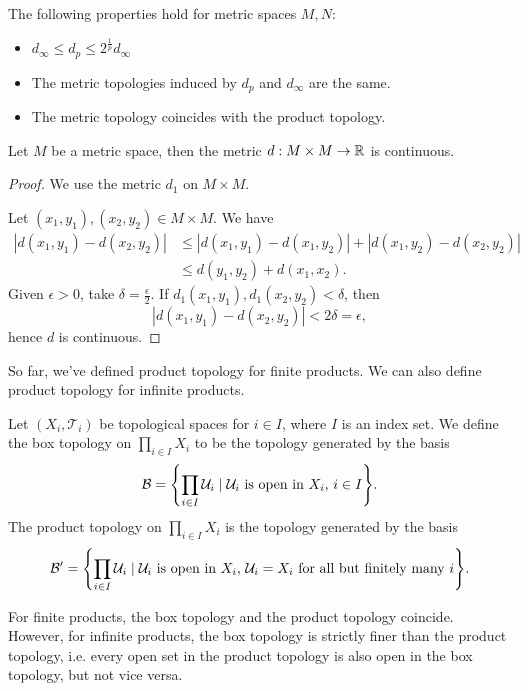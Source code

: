 \begin{prop}
    The following properties hold for metric spaces $M, N$:
    \begin{itemize}
        \item $d_\infty \leq d_p \leq 2^{\frac1p}d_\infty$
        \item The metric topologies induced by $d_p$ and $d_\infty$ are the same.
        \item The metric topology coincides with the product topology.
    \end{itemize}
\end{prop}

\begin{prop}
    Let $M$ be a metric space, then the metric $d : M\times M \to {\mathbb R}$ is continuous.
    \begin{proof}
        We use the metric $d_1$ on $M\times M$.

        Let $(x_1, y_1), (x_2, y_2) \in M\times M$. We have
        \begin{align*}
            |d(x_1, y_1) - d(x_2, y_2)| &\leq |d(x_1, y_1) - d(x_1, y_2)| + |d(x_1, y_2) - d(x_2, y_2)| \\
            &\leq d(y_1, y_2) + d(x_1, x_2).
        \end{align*}
        Given $\epsilon > 0$, take $\delta = \frac\epsilon2$. If $d_1(x_1, y_1), d_1(x_2, y_2) < \delta$, then
        \[
        |d(x_1, y_1) - d(x_2, y_2)| < 2\delta = \epsilon,
        \]
        hence $d$ is continuous.
    \end{proof}
\end{prop}

So far, we've defined product topology for finite products. We can also define product topology for infinite products.

\begin{df}
    Let $(X_i, \mathcal T_i)$ be topological spaces for $i\in I$, where $I$ is an index set. We define the box topology on $\prod_{i\in I} X_i$ to be the topology generated by the basis
    \[
    \mathcal B = {\left\{{\prod_{i\in I} \mathcal U_i \mid \mathcal U_i \text{ is open in }X_i,\, i\in I}\right\}}.
    \]
    The product topology on $\prod_{i\in I} X_i$ is the topology generated by the basis
    \[
    \mathcal B' = {\left\{{\prod_{i\in I} \mathcal U_i \mid \mathcal U_i \text{ is open in }X_i,\, \mathcal U_i = X_i \text{ for all but finitely many }i}\right\}}.
    \]
\end{df}

\begin{rmk}
    For finite products, the box topology and the product topology coincide. However, for infinite products, the box topology is strictly finer than the product topology, i.e. every open set in the product topology is also open in the box topology, but not vice versa.
\end{rmk}

